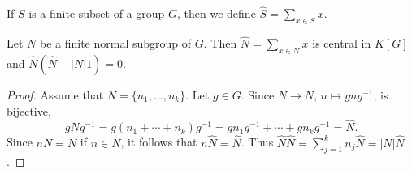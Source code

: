 %

%

If $S$ is a finite subset of a group $G$, then we define 
$\widehat{S}=\sum_{x\in S}x$. 

\begin{lemma}
	\label{lemma:sumN}
	Let $N$ be a finite normal subgroup of $G$. Then $\widehat{N}=\sum_{x\in N}x$ is central
	in $K[G]$ and $\widehat{N}(\widehat{N}-|N|1)=0$.
\end{lemma}

\begin{proof}
	Assume that $N=\{n_1,\dots,n_k\}$. Let 
	$g\in G$. Since $N\to N$, $n\mapsto gng^{-1}$, is bijective, 
	\[
		g\widehat{N}g^{-1}=g(n_1+\cdots+n_k)g^{-1}=gn_1g^{-1}+\cdots+gn_kg^{-1}=\widehat{N}.
	\]
	Since $nN=N$ if $n\in N$, it follows that $n\widehat{N}=\widehat{N}$. Thus 
	$\widehat{N}\widehat{N}=\sum_{j=1}^k n_j\widehat{N}=|N|\widehat{N}$.
\end{proof}

